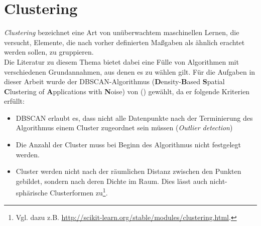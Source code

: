 
\section{Clustering}

\emph{Clustering} bezeichnet eine Art von unüberwachtem maschinellen Lernen,
die versucht, Elemente, die nach vorher definierten Maßgaben als ähnlich erachtet
werden sollen, zu gruppieren.\\
Die Literatur zu diesem Thema bietet dabei eine Fülle von Algorithmen mit verschiedenen
Grundannahmen, aus denen es zu wählen gilt. Für die Aufgaben in dieser Arbeit wurde
der DBSCAN-Algorithmus (\textbf{D}ensity-\textbf{B}ased \textbf{S}patial \textbf{C}lustering of
\textbf{A}pplications with \textbf{N}oise) von (\cite{ester1996density}) gewählt, da er folgende Kriterien erfüllt:
\begin{itemize}
  \item DBSCAN erlaubt es, dass nicht alle Datenpunkte nach der
  Terminierung des Algorithmus einem Cluster zugeordnet sein müssen (\emph{Outlier detection})
  \item Die Anzahl der Cluster muss bei Beginn des Algorithmus nicht festgelegt werden.
  \item Cluster werden nicht nach der räumlichen Distanz zwischen den Punkten gebildet, sondern nach deren
  Dichte im Raum. Dies lässt auch nicht-sphärische Clusterformen zu\footnote{Vgl. dazu z.B. \url{http://scikit-learn.org/stable/modules/clustering.html}.}.
\end{itemize}

